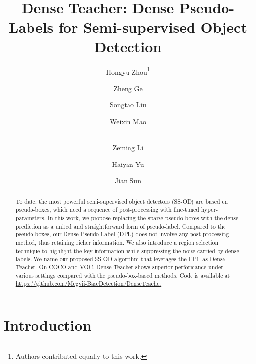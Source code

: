 \documentclass[runningheads]{llncs}
\begin{document}
\pagestyle{headings}
\mainmatter
\def\ECCVSubNumber{961}  

\title{Dense Teacher: Dense Pseudo-Labels for Semi-supervised Object Detection} 



\author{Hongyu Zhou\thanks{Authors contributed equally to this work.} \and
	Zheng Ge \and
	Songtao Liu \and 
    Weixin Mao \and \\
    Zeming Li \and
    Haiyan Yu \and
    Jian Sun
}
\maketitle

\begin{abstract}
To date, the most powerful semi-supervised object detectors (SS-OD) are based on pseudo-boxes, which need a sequence of post-processing with fine-tuned hyper-parameters. In this work, we propose replacing the sparse pseudo-boxes with the dense prediction as a united and straightforward form of pseudo-label. Compared to the pseudo-boxes, our Dense Pseudo-Label (DPL) does not involve any post-processing method, thus retaining richer information. We also introduce a region selection technique to highlight the key information while suppressing the noise carried by dense labels. We name our proposed SS-OD algorithm that leverages the DPL as Dense Teacher. On COCO and VOC, Dense Teacher shows superior performance under various settings compared with the pseudo-box-based methods. Code is available at \url{https://github.com/Megvii-BaseDetection/DenseTeacher}
	\end{abstract}




\section{Introduction}
\end{document}
